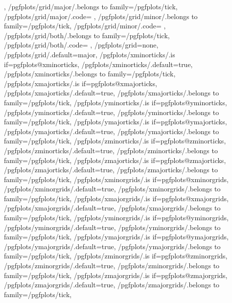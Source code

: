 {{	},
	/pgfplots/grid/major/.belongs to family=/pgfplots/tick,
	/pgfplots/grid/major/.code={%
		\pgfplots@xminorgridsfalse
		\pgfplots@yminorgridsfalse
		\pgfplots@zminorgridsfalse
		\pgfplots@xmajorgridstrue
		\pgfplots@ymajorgridstrue
		\pgfplots@zmajorgridstrue
	},
	/pgfplots/grid/minor/.belongs to family=/pgfplots/tick,
	/pgfplots/grid/minor/.code={%
		\pgfplots@xminorgridstrue
		\pgfplots@yminorgridstrue
		\pgfplots@zminorgridstrue
		\pgfplots@xmajorgridsfalse
		\pgfplots@ymajorgridsfalse
		\pgfplots@zmajorgridsfalse
	},
	/pgfplots/grid/both/.belongs to family=/pgfplots/tick,
	/pgfplots/grid/both/.code={%
		\pgfplots@xminorgridstrue
		\pgfplots@yminorgridstrue
		\pgfplots@zminorgridstrue
		\pgfplots@xmajorgridstrue
		\pgfplots@ymajorgridstrue
		\pgfplots@zmajorgridstrue
	},
	/pgfplots/grid=none,
	/pgfplots/grid/.default=major,
	/pgfplots/xminorticks/.is if=pgfplots@xminorticks,
	/pgfplots/xminorticks/.default=true,
	/pgfplots/xminorticks/.belongs to family=/pgfplots/tick,
	/pgfplots/xmajorticks/.is if=pgfplots@xmajorticks,
	/pgfplots/xmajorticks/.default=true,
	/pgfplots/xmajorticks/.belongs to family=/pgfplots/tick,
	/pgfplots/yminorticks/.is if=pgfplots@yminorticks,
	/pgfplots/yminorticks/.default=true,
	/pgfplots/yminorticks/.belongs to family=/pgfplots/tick,
	/pgfplots/ymajorticks/.is if=pgfplots@ymajorticks,
	/pgfplots/ymajorticks/.default=true,
	/pgfplots/ymajorticks/.belongs to family=/pgfplots/tick,
	/pgfplots/zminorticks/.is if=pgfplots@zminorticks,
	/pgfplots/zminorticks/.default=true,
	/pgfplots/zminorticks/.belongs to family=/pgfplots/tick,
	/pgfplots/zmajorticks/.is if=pgfplots@zmajorticks,
	/pgfplots/zmajorticks/.default=true,
	/pgfplots/zmajorticks/.belongs to family=/pgfplots/tick,
	/pgfplots/xminorgrids/.is if=pgfplots@xminorgrids,
	/pgfplots/xminorgrids/.default=true,
	/pgfplots/xminorgrids/.belongs to family=/pgfplots/tick,
	/pgfplots/xmajorgrids/.is if=pgfplots@xmajorgrids,
	/pgfplots/xmajorgrids/.default=true,
	/pgfplots/xmajorgrids/.belongs to family=/pgfplots/tick,
	/pgfplots/yminorgrids/.is if=pgfplots@yminorgrids,
	/pgfplots/yminorgrids/.default=true,
	/pgfplots/yminorgrids/.belongs to family=/pgfplots/tick,
	/pgfplots/ymajorgrids/.is if=pgfplots@ymajorgrids,
	/pgfplots/ymajorgrids/.default=true,
	/pgfplots/ymajorgrids/.belongs to family=/pgfplots/tick,
	/pgfplots/zminorgrids/.is if=pgfplots@zminorgrids,
	/pgfplots/zminorgrids/.default=true,
	/pgfplots/zminorgrids/.belongs to family=/pgfplots/tick,
	/pgfplots/zmajorgrids/.is if=pgfplots@zmajorgrids,
	/pgfplots/zmajorgrids/.default=true,
	/pgfplots/zmajorgrids/.belongs to family=/pgfplots/tick,
}
